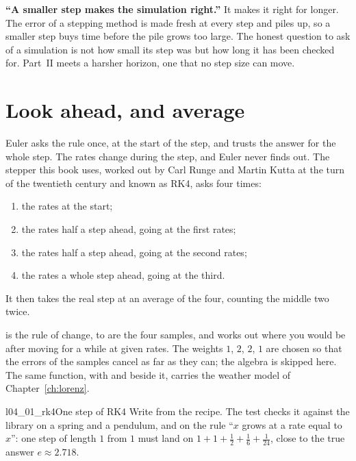 \begin{trapbox}
\textbf{\enquote{A smaller step makes the simulation right.}} It makes it
right for longer. The error of a stepping method is made fresh at every step
and piles up, so a smaller step buys time before the pile grows too large.
The honest question to ask of a simulation is not how small its step was but
how long it has been checked for. Part~II meets a harsher horizon, one that
no step size can move.
\end{trapbox}

\section{Look ahead, and average}
\label{sec:ch04-rk4}

\noindent
Euler asks the rule once, at the start of the step, and trusts the answer for
the whole step. The rates change during the step, and Euler never finds out.
The stepper this book uses, worked out by Carl Runge and Martin Kutta at the
turn of the twentieth century and known as RK4, asks four times:
\begin{enumerate}
\item the rates at the start;
\item the rates half a step ahead, going at the first rates;
\item the rates half a step ahead, going at the second rates;
\item the rates a whole step ahead, going at the third.
\end{enumerate}
It then takes the real step at an average of the four, counting the middle
two twice.


\noindent
{} is the rule of change,  to  are the four
samples, and  works out where you would be after moving for a
while at given rates. The weights $1$, $2$, $2$, $1$ are chosen so that the
errors of the samples cancel as far as they can; the algebra is skipped here.
The same function, with  and  beside it,
carries the weather model of Chapter~\ref{ch:lorenz}.

\begin{lab}{l04_01_rk4}{One step of RK4}
Write  from the recipe. The test checks it against the library
on a spring and a pendulum, and on the rule \enquote{$x$ grows at a rate equal
to $x$}: one step of length $1$ from $1$ must land on $1 + 1 + \tfrac{1}{2} +
\tfrac{1}{6} + \tfrac{1}{24}$, close to the true answer $e \approx
\num{2.718}$.
\end{lab}

